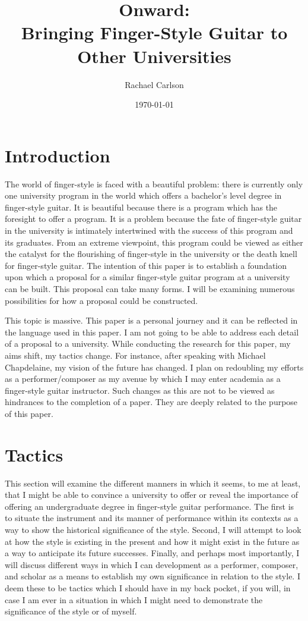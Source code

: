 \documentclass[12pt]{article}
\title{Onward: \\ Bringing Finger-Style Guitar to Other Universities}
\author{Rachael Carlson}
\date{\today}
\begin{document}
\maketitle        
\tableofcontents

\section{Introduction}
\label{sec:introduction}
The world of finger-style is faced with a beautiful problem: there is
currently only one university program in the world which offers a
bachelor's level degree in finger-style guitar. It is beautiful
because there is a program which has the foresight to offer a
program. It is a problem because the fate of finger-style guitar in
the university is intimately intertwined with the success of this
program and its graduates. From an extreme viewpoint, this program
could be viewed as either the catalyst for the flourishing of
finger-style in the university or the death knell for finger-style
guitar. The intention of this paper is to establish a foundation upon
which a proposal for a similar finger-style guitar program at a
university can be built. This proposal can take many forms. I will be
examining numerous possibilities for how a proposal could be constructed.

This topic is massive. This paper is a personal journey and it can be
reflected in the language used in this paper. I am not going to be
able to address each detail of a proposal to a university. While
conducting the research for this paper, my aims shift, my tactics
change. For instance, after speaking with Michael Chapdelaine, my
vision of the future has changed. I plan on redoubling my efforts as a
performer/composer as my avenue by which I may enter academia as a
finger-style guitar instructor. Such changes as this are not to be
viewed as hindrances to the completion of a paper. They are deeply
related to the purpose of this paper.

\section{Tactics}
\label{sec:tactics}
This section will examine the different manners in which it seems, to
me at least, that I might be able to convince a university to offer or
reveal the importance of offering an undergraduate degree in
finger-style guitar performance. The first is to situate the
instrument and its manner of performance within its contexts as a way
to show the historical significance of the style. Second, I will
attempt to look at how the style is existing in the present and how it
might exist in the future as a way to anticipate its future
successes. Finally, and perhaps most importantly, I will discuss
different ways in which I can development as a performer, composer,
and scholar as a means to establish my own significance in relation to
the style. I deem these to be tactics which I should have in my back
pocket, if you will, in case I am ever in a situation in which I might
need to demonstrate the significance of the style or of myself.
\end{document}
